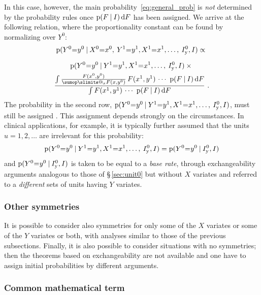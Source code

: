 \documentclass[a4paper,12pt,%
onecolumn,oneside,article,%
british%
]{memoir}
\makeatletter
\def\sum{\DOTSI\sumop\slimits@}
\newcommand*{\di}{\mathop{}\!\mathrm{d}}%
\newcommand*{\p}{\mathrm{p}}%
\renewcommand*{\|}[1][]{\nonscript\:#1\vert\nonscript\:\mathopen{}}
\newcommand*{\mo}[1][=]{\mathclose{}\mathord{\nonscript\mkern0.5mu#1\nonscript\mkern0.5mu}\mathopen{}}
\newcommand*{\sect}{\S}%
\newcommand*{\Iy}{I_{\textrm{y}}}
\makeatother
\begin{document}
  In this case, however, the main probability~\eqref{eq:general_prob} is \emph{not} determined by the probability rules once $\p(F \|I) \di F$ has been assigned. We arrive at the following relation, where the proportionality constant can be found by normalizing over $Y^{0}$:
\begin{multline}
  \label{eq:relation_exchY}
  \p(Y^{0}\mo y^{0} \|
  X^{0}\mo x^{0},\: Y^{1}\mo y^{1},X^{1}\mo x^{1},\dotsc,\: \Iy^{0},I)
  \propto
{}\\[2\jot]
  \p(Y^{0}\mo y^{0} \|
  Y^{1}\mo y^{1},X^{1}\mo x^{1},\dotsc,\: \Iy^{0},I) \times{}\\
  \frac{
    \int \frac{F(x^{0},y^{0})}{\sum_{x}F(x,y^{0})}\, F(x^{1},y^{1})\,\dotsm\  \p(F  \|I) \di F
  }{
    \int F(x^{1},y^{1})\,\dotsm\  \p(F  \|I) \di F
  } \ .
\end{multline}
The probability in the second row, $\p(Y^{0}\mo y^{0} \| Y^{1}\mo y^{1},X^{1}\mo x^{1},\dotsc,\: \Iy^{0},I)$, must still be assigned \autocites{lindleyetal1981}. This assignment depends strongly on the circumstances. In clinical applications, for example, it is typically further assumed that the units $u=1,2,\dotsc$ are irrelevant for this probability:
\begin{equation}
  \label{eq:indepYfromdata}
    \p(Y^{0}\mo y^{0} \|
  Y^{1}\mo y^{1},X^{1}\mo x^{1},\dotsc,\: \Iy^{0},I) =
    \p(Y^{0}\mo y^{0} \| \Iy^{0},I)
\end{equation}
and $\p(Y^{0}\mo y^{0} \| \Iy^{0},I)$ is taken to be equal to a \emph{base rate}\autocites{barhillel1980,jennyetal2018,sprengeretal2021,matthews1996}, through exchangeability arguments analogous to those of \sect\,\ref{sec:unit0} but without $X$ variates and referred to a \emph{different} sets of units having $Y$ variates.

\subsubsection{Other symmetries}
\label{sec:other_symm}

It is possible to consider also symmetries for only some of the $X$ variates or some of the $Y$ variates or both, with analyses similar to those of the previous subsections. Finally, it is also possible to consider situations with no symmetries; then the theorems based on exchangeability are not available and one have to assign initial probabilities by different arguments.

\subsubsection{Common mathematical term}
\label{sec:common_term}
\end{document}
